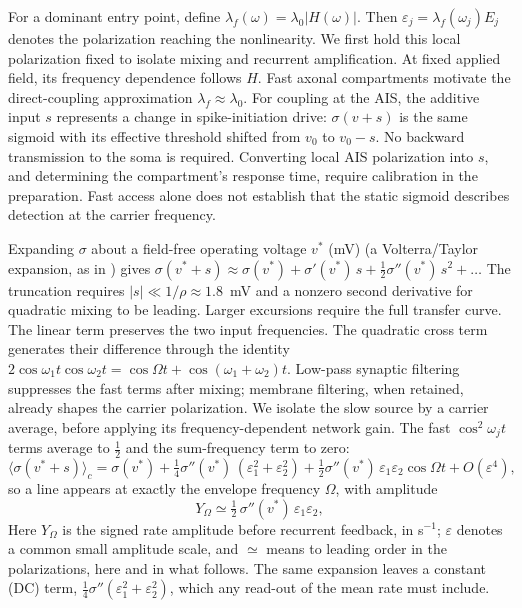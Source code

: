 \documentclass[11pt,a4paper]{article}
\newcommand{\Sig}{\sigma}
\newcommand{\half}{\tfrac{1}{2}}
\begin{document}
For a dominant entry point, define $\lambda_f(\omega)=\lambda_0|H(\omega)|$.
Then $\varepsilon_j=\lambda_f(\omega_j)E_j$ denotes the
polarization reaching the nonlinearity. We first hold this local polarization fixed to isolate mixing and recurrent
amplification. At fixed applied field, its frequency dependence follows $H$.
Fast axonal compartments motivate the direct-coupling approximation
$\lambda_f\approx\lambda_0$. For coupling at the AIS, the additive input $s$
represents a change in spike-initiation drive: $\Sig(v+s)$ is the same
sigmoid with its effective threshold shifted from $v_0$ to $v_0-s$.
No backward transmission to the soma is required. Converting local AIS
polarization into $s$, and determining the compartment's response time,
require calibration in the preparation. Fast access alone does not establish
that the static sigmoid describes detection at the carrier frequency.

Expanding $\Sig$ about a field-free operating voltage $v^*$ (mV) (a Volterra/Taylor expansion, as
in \cite{ruffini2025ham}) gives
$\Sig(v^*+s)\approx\Sig(v^*)+\Sig'(v^*)\,s+\half\Sig''(v^*)\,s^2+\dots$
The truncation requires $|s|\ll1/\rho\approx1.8$~mV and a nonzero second derivative
for quadratic mixing to be leading. Larger excursions require the full transfer curve.
The linear term preserves the two input frequencies. The quadratic cross term
generates their difference through the identity
$2\cos\omega_1t\cos\omega_2t=\cos\Omega t+\cos(\omega_1+\omega_2)t$.
Low-pass synaptic filtering suppresses the fast terms after mixing; membrane
filtering, when retained, already shapes the carrier polarization. We isolate
the slow source by a carrier average, before applying its frequency-dependent
network gain. The fast
$\cos^2\omega_jt$ terms average to $\half$ and the sum-frequency term to zero:
\begin{equation}
\big\langle\Sig(v^*+s)\big\rangle_c
=\Sig(v^*)+\tfrac14\Sig''(v^*)\,(\varepsilon_1^2+\varepsilon_2^2)
+\tfrac12\Sig''(v^*)\,\varepsilon_1\varepsilon_2\cos\Omega t+O(\varepsilon^4),
\label{eq:taylor}
\end{equation}
so a line appears at exactly the envelope frequency $\Omega$, with amplitude
\begin{equation}
Y_\Omega\simeq\half\,\Sig''(v^*)\,\varepsilon_1\varepsilon_2 ,
\label{eq:demod}
\end{equation}
Here $Y_\Omega$ is the signed rate amplitude before recurrent feedback, in s$^{-1}$;
$\varepsilon$ denotes a common small amplitude scale, and $\simeq$ means to leading
order in the polarizations, here and in what follows. The
same expansion leaves a constant (DC) term, $\tfrac14\Sig''(\varepsilon_1^2+\varepsilon_2^2)$,
which any read-out of the mean rate must include.
\end{document}
